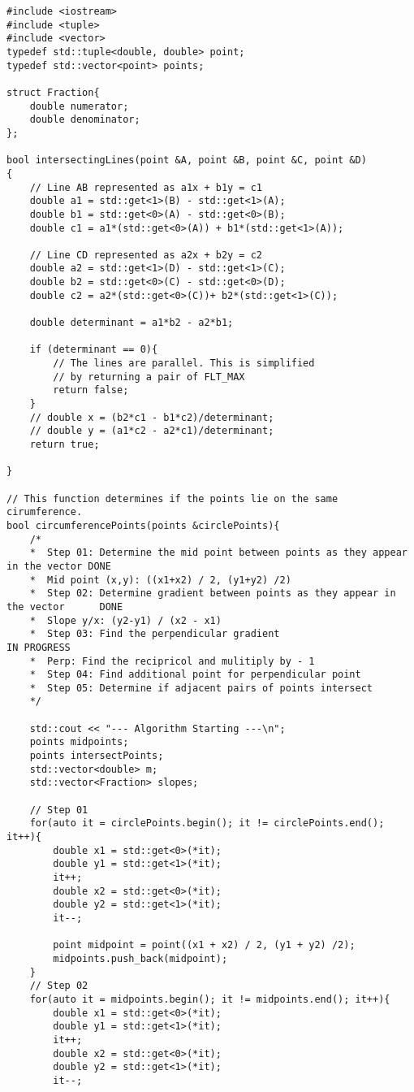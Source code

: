 \documentclass[12pt]{amsart}
\begin{document}
\begin{lstlisting}
#include <iostream>
#include <tuple>
#include <vector>
typedef std::tuple<double, double> point;
typedef std::vector<point> points;

struct Fraction{
    double numerator;
    double denominator;
};

bool intersectingLines(point &A, point &B, point &C, point &D)
{
    // Line AB represented as a1x + b1y = c1
    double a1 = std::get<1>(B) - std::get<1>(A);
    double b1 = std::get<0>(A) - std::get<0>(B);
    double c1 = a1*(std::get<0>(A)) + b1*(std::get<1>(A));
 
    // Line CD represented as a2x + b2y = c2
    double a2 = std::get<1>(D) - std::get<1>(C);
    double b2 = std::get<0>(C) - std::get<0>(D);
    double c2 = a2*(std::get<0>(C))+ b2*(std::get<1>(C));
 
    double determinant = a1*b2 - a2*b1;
 
    if (determinant == 0){
        // The lines are parallel. This is simplified
        // by returning a pair of FLT_MAX
        return false;
    }
    // double x = (b2*c1 - b1*c2)/determinant;
    // double y = (a1*c2 - a2*c1)/determinant;
    return true;
    
}

// This function determines if the points lie on the same cirumference.
bool circumferencePoints(points &circlePoints){
    /*
    *  Step 01: Determine the mid point between points as they appear in the vector DONE
    *  Mid point (x,y): ((x1+x2) / 2, (y1+y2) /2)
    *  Step 02: Determine gradient between points as they appear in the vector      DONE
    *  Slope y/x: (y2-y1) / (x2 - x1)
    *  Step 03: Find the perpendicular gradient                                     IN PROGRESS
    *  Perp: Find the recipricol and mulitiply by - 1
    *  Step 04: Find additional point for perpendicular point
    *  Step 05: Determine if adjacent pairs of points intersect
    */

    std::cout << "--- Algorithm Starting ---\n";
    points midpoints;
    points intersectPoints;
    std::vector<double> m;
    std::vector<Fraction> slopes;

    // Step 01
    for(auto it = circlePoints.begin(); it != circlePoints.end(); it++){
        double x1 = std::get<0>(*it);
        double y1 = std::get<1>(*it);
        it++;
        double x2 = std::get<0>(*it);
        double y2 = std::get<1>(*it);
        it--;

        point midpoint = point((x1 + x2) / 2, (y1 + y2) /2);
        midpoints.push_back(midpoint);
    }
    // Step 02
    for(auto it = midpoints.begin(); it != midpoints.end(); it++){
        double x1 = std::get<0>(*it);
        double y1 = std::get<1>(*it);
        it++;
        double x2 = std::get<0>(*it);
        double y2 = std::get<1>(*it);
        it--;


\end{lstlisting}
\end{document}
